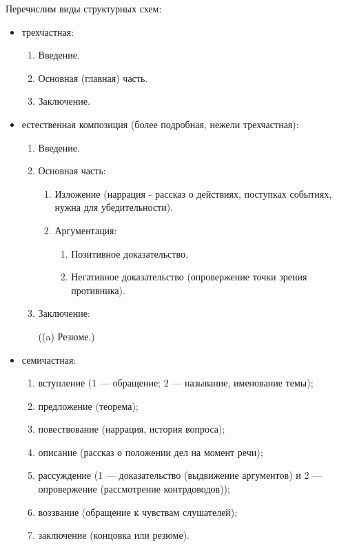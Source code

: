 Перечислим виды структурных схем: 
\begin{itemize}
    \item трехчастная:
        \begin{enumerate}
            \item Введение.
            \item Основная (главная) часть.
            \item Заключение.
        \end{enumerate}
    \item естественная композиция (более подробная, нежели трехчастная):
        \begin{enumerate}
            \item Введение.
            \item Основная часть:
                \begin{enumerate}
                    \item  Изложение (наррация - рассказ о действиях, поступках событиях, нужна для убедительности).
                    \item Аргументация:
                        \begin{enumerate}
                            \item Позитивное доказательство.
                            \item Негативное доказательство (опровержение точки зрения 				противника).
                        \end{enumerate}
                \end{enumerate}
        \item  Заключение:

            ((a) Резюме.)
        \end{enumerate}
    \item семичастная:
        \begin{enumerate}
            \item вступление (1 — обращение; 2 — называние, именование темы);
            \item предложение (теорема);
            \item повествование (наррация, история вопроса);
            \item описание (рассказ о положении дел на момент речи);
            \item рассуждение (1 — доказательство (выдвижение аргументов) и 2 — опровержение (рассмотрение контрдоводов));
            \item воззвание (обращение к чувствам слушателей);
            \item заключение (концовка или резюме).
        \end{enumerate}
\end{itemize}

